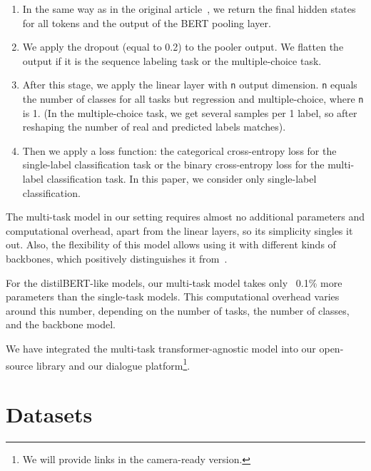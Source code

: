 \begin{enumerate}

    \item In the same way as in the original article~\cite{bert}, we return the final hidden states for all tokens and the output of the BERT pooling layer.

    \item We apply the dropout (equal to 0.2) to the pooler output. We flatten the output if it is the sequence labeling task or the multiple-choice task.

    \item After this stage, we apply the linear layer with \texttt{n} output dimension. \texttt{n} equals the number of classes for all tasks but regression and multiple-choice, where \texttt{n} is 1. (In the multiple-choice task, we get several samples per 1 label, so after reshaping the number of real and predicted labels matches). 

    \item Then we apply a loss function: the categorical cross-entropy loss for the single-label classification task or the binary cross-entropy loss for the multi-label classification task. In this paper, we consider only single-label classification.

\end{enumerate}

The multi-task model in our setting requires almost no additional parameters and computational overhead, apart from the linear layers, so its simplicity singles it out. Also, the flexibility of this model allows using it with different kinds of backbones, which positively distinguishes it from~\cite{PAL:19}.

For the distilBERT-like models, our multi-task model takes only ~0.1\% more parameters than the single-task models. This computational overhead varies around this number, depending on the number of tasks, the number of classes, and the backbone model. 
\iffalse
The multi-task transformer-agnostic model is integrated into DeepPavlov~\cite{Burtsev2018DeepPavlovAO}. This model is also successfully used in the Dream dialogue platform~\cite{baymurzina2021dream}. 
\else
We have integrated the multi-task transformer-agnostic model into our open-source library and our dialogue platform\footnote{We will provide links in the camera-ready version.}.
\fi

\section{Datasets}

